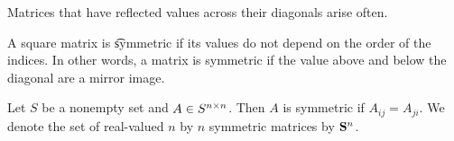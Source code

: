
\sbasic


























\sstart
{}


Matrices that have reflected values
across their diagonals arise often.


A square matrix is \t{symmetric} if its values do not depend on the order of the indices.
In other words, a matrix is symmetric if the value above and below the diagonal are a mirror image.



Let $S$ be a nonempty set and $A \in S^{n \times n}$.
Then $A$ is symmetric if $A_{ij} = A_{ji}$.
We denote the set of real-valued $n$ by $n$
symmetric matrices by $\mathbf{S}^{n}$.
\strats

